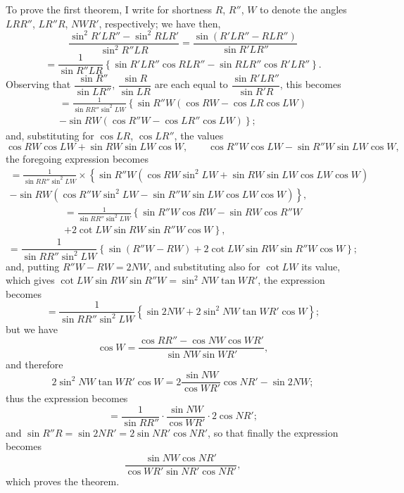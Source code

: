 \documentclass[11pt,a4paper]{book}
\theoremstyle{plain}
\begin{document}
To prove the first theorem, I write for shortness $R$, $R''$, $W$ to denote the angles $LRR''$, $LR''R$, $NWR'$, respectively; we have then,
\[
\frac{\sin^2R'LR''-\sin^2RLR'}{\sin^2R''LR}
=\frac{\sin(R'LR''-RLR'')}{\sin R'LR''}
\]
\[
=\frac{1}{\sin R''LR}\left\{\sin R'LR''\cos RLR''-\sin RLR''\cos R'LR''\right\}.
\]
Observing that $\dfrac{\sin R''}{\sin LR''}$, $\dfrac{\sin R}{\sin LR}$ are each equal to $\dfrac{\sin R'LR''}{\sin R'R}$, this becomes
\begin{multline*}
=\frac{1}{\sin RR''\sin^2LW}
\left\{\sin R''W(\cos RW-\cos LR\cos LW)\right.\\
\left.-\sin RW(\cos R''W-\cos LR''\cos LW)\right\};
\end{multline*}
and, substituting for $\cos LR$, $\cos LR''$, the values
\[
\cos RW\cos LW+\sin RW\sin LW\cos W,\qquad
\cos R''W\cos LW-\sin R''W\sin LW\cos W,
\]
the foregoing expression becomes
\begin{multline*}
=\frac{1}{\sin RR''\sin^2LW}
\times\left\{\sin R''W(\cos RW\sin^2LW+\sin RW\sin LW\cos LW\cos W)\right.\\
\left.-\sin RW(\cos R''W\sin^2LW-\sin R''W\sin LW\cos LW\cos W)\right\},
\end{multline*}
\begin{multline*}
=\frac{1}{\sin RR''\sin^2LW}
\left\{\sin R''W\cos RW-\sin RW\cos R''W\right.\\
\left.+2\cot LW\sin RW\sin R''W\cos W\right\},
\end{multline*}
\[
=\frac{1}{\sin RR''\sin^2LW}
\left\{\sin(R''W-RW)+2\cot LW\sin RW\sin R''W\cos W\right\};
\]
and, putting $R''W-RW=2NW$, and substituting also for $\cot LW$ its value, which gives $\cot LW\sin RW\sin R''W=\sin^2NW\tan WR'$, the expression becomes
\[
=\frac{1}{\sin RR''\sin^2LW}
\left\{\sin 2NW+2\sin^2NW\tan WR'\cos W\right\};
\]
but we have
\[
\cos W=\frac{\cos RR''-\cos NW\cos WR'}{\sin NW\sin WR'},
\]
and therefore
\[
2\sin^2NW\tan WR'\cos W=2\frac{\sin NW}{\cos WR'}\cos NR'-\sin 2NW;
\]
thus the expression becomes
\[
=\frac{1}{\sin RR''}\cdot\frac{\sin NW}{\cos WR'}\cdot2\cos NR';
\]
and $\sin R''R=\sin 2NR'=2\sin NR'\cos NR'$, so that finally the expression becomes
\[
\frac{\sin NW\cos NR'}{\cos WR'\sin NR'\cos NR'},
\]
which proves the theorem.
\end{document}
